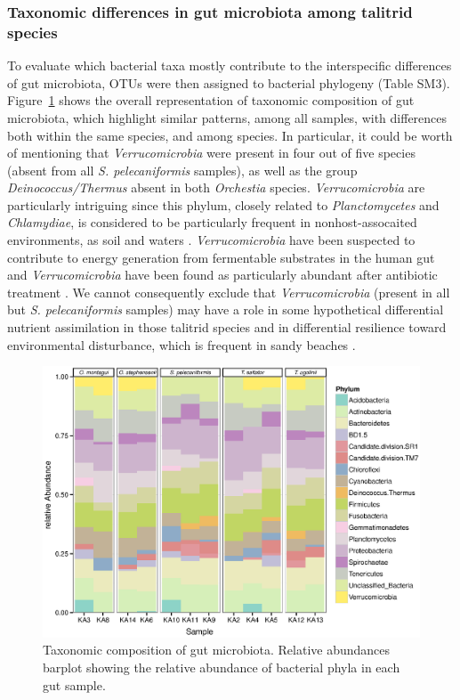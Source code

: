 \subsubsection{Taxonomic differences in gut microbiota among talitrid species}
To evaluate which bacterial taxa mostly contribute to the interspecific differences of gut microbiota, OTUs were then assigned to bacterial phylogeny (Table SM3). Figure~\ref{fig:4talkal} shows the overall representation of taxonomic composition of gut microbiota, which highlight similar patterns, among all samples, with differences both within the same species, and among species. In particular, it could be worth of mentioning that \textit{Verrucomicrobia} were present in four out of five species (absent from all \textit{S. pelecaniformis} samples), as well as the group \textit{Deinococcus/Thermus} absent in both \textit{Orchestia} species. \textit{Verrucomicrobia} are particularly intriguing since this phylum, closely related to \textit{Planctomycetes} and \textit{Chlamydiae}, is considered to be particularly frequent in nonhost-assocaited environments, as soil and waters \cite{buckley2001environmental,freitas2012global}. \textit{Verrucomicrobia} have been suspected to contribute to energy generation from fermentable substrates in the human gut \cite{arumugam2011enterotypes} and \textit{Verrucomicrobia} have been found as particularly abundant after antibiotic treatment \cite{dubourg2013high}. We cannot consequently exclude that \textit{Verrucomicrobia} (present in all but \textit{S. pelecaniformis} samples) may have a role in some hypothetical differential nutrient assimilation in those talitrid species and in differential resilience toward environmental disturbance, which is frequent in sandy beaches \cite{defeo2009threats, ugolini2012sandhoppers, ugolini2005heavy, ugolini2008amphipod, ungherese2010relationship, moffett1998impact}.\\
\begin{figure}[!tb]
	\centering
	\includegraphics[width=1\textwidth]{./figures/Chapter_6/Figure_4_talkaled.eps}
  	\caption{Taxonomic composition of gut microbiota. Relative abundances barplot showing the relative abundance of bacterial phyla in each gut sample.\label{fig:4talkal}}
\end{figure}
